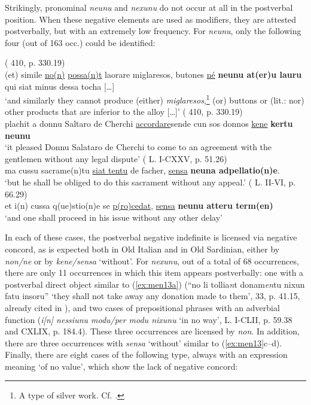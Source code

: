 \documentclass[output=paper,colorlinks,citecolor=brown]{langscibook}
\begin{document}
Strikingly, pronominal \textit{neunu} and \textit{nexunu} do not occur at all in the postverbal position. When these negative elements are used as modifiers, they are attested postverbally, but with an extremely low frequency. For \textit{neunu}, only the following four (out of 163 occ.) could be identified: 

\ea\label{ex:men13}
    \ea\label{ex:men13a}( 410, p. 330.19)\\
     (et) simile \ul{no(n)} \ul{possa(n)t} laorare miglaresos, butones \ul{né} \textbf{neunu at(er)u lauru} qui siat minus dessa tocha […]\\
    ‘and similarly they cannot produce (either) \textit{miglaresos},\footnote{A type of silver work. Cf. \citet[][128]{Tola1850}.} (or) buttons or (lit.: nor) other products that are inferior to the alloy […]’
    \ex\label{ex:men13b}( 410, p. 330.19)\\
     plachit a donnu Saltaro de Cherchi \ul{accordare}sende cun sos donnos \ul{kene} \textbf{kertu neunu}\\
    ‘it pleased Donnu Salataro de Cherchi to come to an agreement with the gentlemen without any legal dispute’
    \ex\label{ex:men13c}( L. I-CXXV, p. 51.26)\\
     ma cussu sacrame(n)tu \ul{siat tentu} de facher, \ul{sensa} \textbf{neuna adpellatio(n)e}.\\
    ‘but he shall be obliged to do this sacrament without any appeal.’
    \ex\label{ex:men13d}( L. II-VI, p. 66.29)\\
     et i(n) cussa q(ue)stio(n)e se \ul{p(ro)cedat}, \ul{sensa} \textbf{neunu atteru term(en)}\\
    ‘and one shall proceed in his issue without any other delay’
\z
\z

In each of these cases, the postverbal negative indefinite is licensed via negative concord, as is expected both in Old Italian and in Old Sardinian, either by \textit{non/ne} or by \textit{kene/sensa} ‘without’. For \textit{nexunu}, out of a total of 68 occurrences, there are only 11 occurrences in which this item appears postverbally: one with a postverbal direct object similar to (\ref{ex:men13a}) (“no li tollia\textit{n}t donam\textit{en}tu nixun fatu insoru” ‘they shall not take away any donation made to them’,  33, p. 41.15, already cited in ), and two cases of prepositional phrases with an adverbial function (\textit{i[n] nessiunu modu/per modu nixunu} ‘in no way’,  L. I-CLII, p. 59.38 and   CXLIX, p. 184.4). These three occurrences are licensed by \textit{non}. In addition, there are three occurrences with \textit{sensa} ‘without’ similar to (\ref{ex:men13}c--d). Finally, there are eight cases of the following type, always with an expression meaning ‘of no value’, which show the lack of negative concord:
\end{document}
